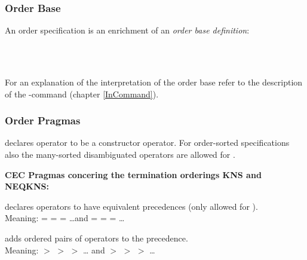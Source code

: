 {\subsubsection{Order Base}
\label{orderBase}

\noindent
An order specification is an enrichment of an {\em order base definition}:

\begin{syntax}
 \IS {} \kw{(}  \kw{)}  \END
\\
 \IS  {}   
		      \OR  {} \kw{+}  \END
\\
 \IS {}
		\OR {}
\end{syntax}

For an explanation of the interpretation of the order base refer to the description of the
-command ( chapter \ref{InCommand}).
\subsubsection{Order Pragmas}
\label{OrderPragmas}

\begin{command}
declares operator  to be a constructor operator. 
For order-sorted specifications also 
the many-sorted disambiguated operators are allowed for .
\end{command}

\noindent
{\bf CEC Pragmas concering the termination orderings KNS and NEQKNS:}\bigskip

\begin{command}
declares operators to have equivalent precedences (only allowed for ).\\
Meaning:  =  =  = \ldots and 
 =  =  = \ldots
\end{command}

\begin{command}
adds ordered pairs of operators to the precedence.\\
Meaning:  $>$  $>$  $>$ \ldots 
and  $>$  $>$  $>$ \ldots
\end{command}

}
